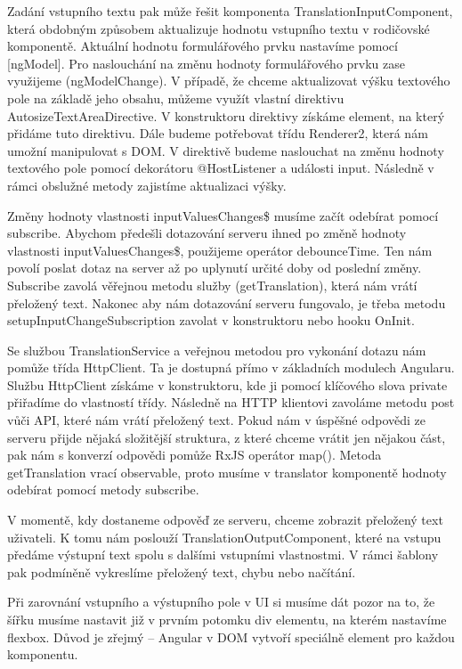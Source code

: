 Zadání vstupního textu pak může řešit komponenta TranslationInputComponent, která obdobným způsobem aktualizuje hodnotu vstupního textu v rodičovské komponentě. 
Aktuální hodnotu formulářového prvku nastavíme pomocí [ngModel]. Pro naslouchání na změnu hodnoty formulářového prvku zase využijeme (ngModelChange). 
V případě, že chceme aktualizovat výšku textového pole na základě jeho obsahu, můžeme využít vlastní direktivu AutosizeTextAreaDirective. 
V konstruktoru direktivy získáme element, na který přidáme tuto direktivu. Dále budeme potřebovat třídu Renderer2, která nám umožní manipulovat s DOM. 
V direktivě budeme naslouchat na změnu hodnoty textového pole pomocí dekorátoru @HostListener a události input. Následně v rámci obslužné metody zajistíme aktualizaci výšky.
 
Změny hodnoty vlastnosti inputValuesChanges\$ musíme začít odebírat pomocí subscribe. 
Abychom předešli dotazování serveru ihned po změně hodnoty vlastnosti inputValuesChanges\$, použijeme operátor debounceTime. 
Ten nám povolí poslat dotaz na server až po uplynutí určité doby od poslední změny. 
Subscribe zavolá věřejnou metodu služby (getTranslation), která nám vrátí přeložený text. 
Nakonec aby nám dotazování serveru fungovalo, je třeba metodu setupInputChangeSubscription zavolat v konstruktoru nebo hooku OnInit.

Se službou TranslationService a veřejnou metodou pro vykonání dotazu nám pomůže třída HttpClient. Ta je dostupná přímo v základních modulech Angularu.
Službu HttpClient získáme v konstruktoru, kde ji pomocí klíčového slova private přiřadíme do vlastností třídy. 
Následně na HTTP klientovi zavoláme metodu post vůči API, které nám vrátí přeložený text. 
Pokud nám v úspěšné odpovědi ze serveru přijde nějaká složitější struktura, z které chceme vrátit jen nějakou část, pak nám s konverzí odpovědi pomůže RxJS operátor map(). 
Metoda getTranslation vrací observable, proto musíme v translator komponentě hodnoty odebírat pomocí metody subscribe. 

V momentě, kdy dostaneme odpověď ze serveru, chceme zobrazit přeložený text uživateli. 
K tomu nám poslouží TranslationOutputComponent, které na vstupu předáme výstupní text spolu s dalšími vstupními vlastnostmi. 
V rámci šablony pak podmíněně vykreslíme přeložený text, chybu nebo načítání. 

Při zarovnání vstupního a výstupního pole v UI si musíme dát pozor na to, že šířku musíme nastavit již v prvním potomku div elementu, na kterém nastavíme flexbox. 
Důvod je zřejmý -- Angular v DOM vytvoří speciálně element pro každou komponentu.

